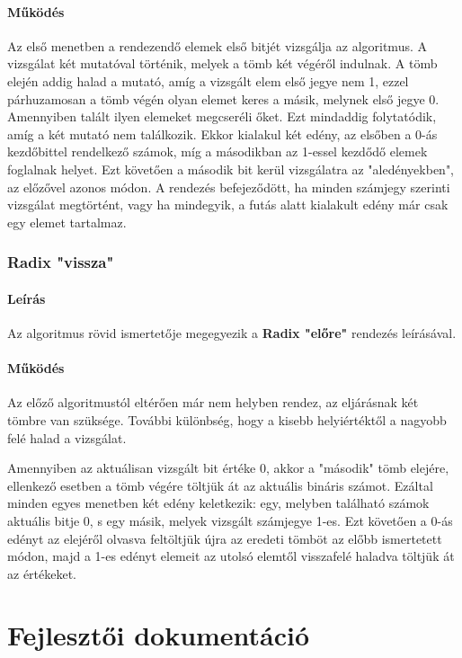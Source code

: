 \documentclass{elteikthesis}
\begin{document}
\subsubsection{Működés}
Az első menetben a rendezendő elemek első bitjét vizsgálja az algoritmus. A vizsgálat két mutatóval történik, melyek a tömb két végéről indulnak. A tömb elején addig halad a mutató, amíg a vizsgált elem első jegye nem 1, ezzel párhuzamosan a tömb végén olyan elemet keres a másik, melynek első jegye 0. Amennyiben talált ilyen elemeket megcseréli őket. Ezt mindaddig folytatódik, amíg a két mutató nem találkozik. Ekkor kialakul két edény, az elsőben a 0-ás kezdőbittel rendelkező számok, míg a másodikban az 1-essel kezdődő elemek foglalnak helyet. Ezt követően a második bit kerül vizsgálatra az "aledényekben", az előzővel azonos módon. A rendezés befejeződött, ha minden számjegy szerinti vizsgálat megtörtént, vagy ha mindegyik, a futás alatt kialakult edény már csak egy elemet tartalmaz.

\subsection{Radix "vissza"}
\subsubsection{Leírás}
Az algoritmus rövid ismertetője megegyezik a \textbf{Radix "előre"} rendezés leírásával.
\subsubsection{Működés}
Az előző algoritmustól eltérően már nem helyben rendez, az eljárásnak két tömbre van szüksége. További különbség, hogy a kisebb helyiértéktől a nagyobb felé halad a vizsgálat.\par Amennyiben az aktuálisan vizsgált bit értéke 0, akkor a "második" tömb elejére, ellenkező esetben a tömb végére töltjük át az aktuális bináris számot. Ezáltal minden egyes menetben két edény keletkezik: egy, melyben található számok aktuális bitje 0, s egy másik, melyek vizsgált számjegye 1-es. Ezt követően a 0-ás edényt az elejéről olvasva feltöltjük újra az eredeti tömböt az előbb ismertetett módon, majd a 1-es edényt elemeit az utolsó elemtől visszafelé haladva töltjük át az értékeket.

\chapter{Fejlesztői dokumentáció}
\end{document}
